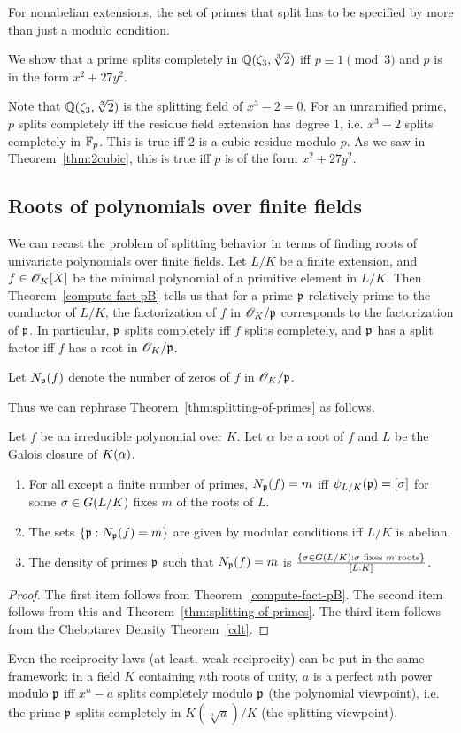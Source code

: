 For nonabelian extensions, the set of primes that split has to be specified by more than just a modulo condition.
\begin{ex}
We show that a prime splits completely in $\mathbb{Q}(\zeta_3,\sqrt[3]2)$ iff $p\equiv1 \pmod3$ and $p$ is in the form $x^2+27y^2$.

Note that $\mathbb{Q}(\zeta_3,\sqrt[3]2)$ is the splitting field of $x^3-2=0$. 
For an unramified prime, $p$ splits completely iff the residue field extension has degree 1, i.e. $x^3-2$ splits completely in $\mathbb{F}_p$. This is true iff 2 is a cubic residue modulo $p$. As we saw in Theorem~\ref{thm:2cubic}, this is true iff $p$ is of the form $x^2+27y^2$.
\end{ex}
\subsection{Roots of polynomials over finite fields}
We can recast the problem of splitting behavior in terms of finding roots of univariate polynomials over finite fields. Let $L/K$ be a finite extension, and $f\in \mathscr{O}_K[X]$ be the minimal polynomial of a primitive element in $L/K$. Then Theorem~\ref{compute-fact-pB} tells us that for a prime $\mathfrak{p}$ relatively prime to the conductor of $L/K$, the factorization of $f$ in $\mathscr{O}_K/\mathfrak{p}$ corresponds to the factorization of $\mathfrak{p}$. In particular, $\mathfrak{p}$ splits completely iff $f$ splits completely, and $\mathfrak{p}$ has a split factor iff $f$ has a root in $\mathscr{O}_K/\mathfrak{p}$.
\begin{df}
Let $N_{\mathfrak{p}}(f)$ denote the number of zeros of $f$ in $\mathscr{O}_K/\mathfrak{p}$.
\end{df}

Thus we can rephrase Theorem~\ref{thm:splitting-of-primes} as follows.
\begin{thm}
Let $f$ be an irreducible polynomial over $K$. Let $\alpha$ be a root of $f$ and $L$ be the Galois closure of $K(\alpha)$. 
\begin{enumerate}
\item
For all except a finite number of primes, $N_{\mathfrak{p}}(f)=m$ iff $\psi_{L/K}(\mathfrak{p})=[\sigma]$ for some $\sigma\in G(L/K)$ fixes $m$ of the roots of $L$.
\item
The sets $\left\{{\mathfrak{p}}:{N_{\mathfrak{p}}(f)=m}\right\}$ are given by modular conditions iff $L/K$ is abelian.
\item
The density of primes $\mathfrak{p}$ such that $N_{\mathfrak{p}}(f)=m$ is $\frac{\left\{{\sigma \in G(L/K)}:{\sigma\text{ fixes $m$ roots}}\right\}}{[L:K]}$.
\end{enumerate}
\end{thm}
\begin{proof}
The first item follows from Theorem~\ref{compute-fact-pB}. The second item follows from this and Theorem~\ref{thm:splitting-of-primes}. The third item follows from the Chebotarev Density Theorem~\ref{cdt}.
\end{proof}
Even the reciprocity laws (at least, weak reciprocity) can be put in the same framework: in a field $K$ containing $n$th roots of unity, $a$ is a perfect $n$th power modulo $\mathfrak{p}$ iff $x^n-a$ splits completely modulo $\mathfrak{p}$ (the polynomial viewpoint), i.e. the prime $\mathfrak{p}$ splits completely in $K(\sqrt[n]{a})/K$ (the splitting viewpoint).
